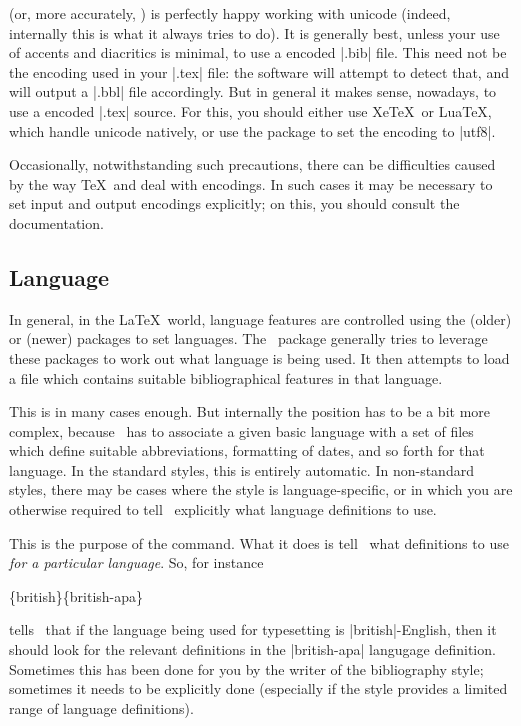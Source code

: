  (or, more accurately, ) is perfectly happy working with unicode (indeed, internally this is what it always tries to do). It is generally best, unless your use of accents and diacritics is minimal, to use a  encoded |.bib| file. This need not be the encoding used in your |.tex| file: the software will attempt to detect that, and will output a |.bbl| file accordingly. But in general it makes sense, nowadays, to use a  encoded |.tex| source. For this, you should either use Xe\TeX\ or Lua\TeX, which handle unicode natively, or use the  package to set the encoding to |utf8|.

Occasionally, notwithstanding such precautions, there can be difficulties caused by the way \TeX\ and  deal with encodings. In such cases it may be necessary to set input and output encodings explicitly; on this, you should consult the  documentation.

\subsection{Language}

In general, in the \LaTeX\ world, language features are controlled using the (older)  or (newer)  packages to set languages. The \biblatex\ package generally tries to leverage these packages to work out what language is being used. It then attempts to load a file which contains suitable bibliographical features in that language.

This is in many cases enough. But internally the position has to be a bit more complex, because \biblatex\ has to associate a given basic language with a set of files which define suitable abbreviations, formatting of dates, and so forth for that language. In the standard styles, this is entirely automatic. In non-standard styles, there may be cases where the style is language-specific, or in which you are otherwise required to tell \biblatex\ explicitly what language definitions to use.

This is the purpose of the  command. What it does is tell \biblatex\ what definitions to use \emph{for a particular language}. So, for instance
\begin{pseudoverb}
\{british\}\{british-apa\}
\end{pseudoverb}
tells \biblatex\ that if the language being used for typesetting is |british|-English, then it should look for the relevant definitions in the |british-apa| langugage definition. Sometimes this has been done for you by the writer of the bibliography style; sometimes it needs to be explicitly done (especially if the style provides a limited range of language definitions).

